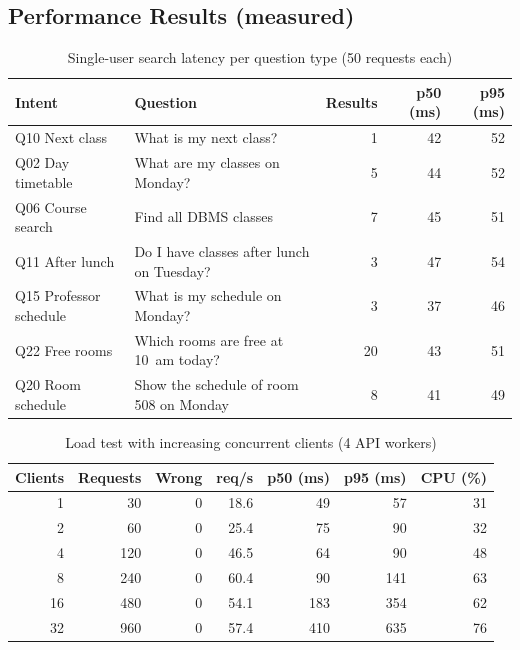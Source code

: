 \subsection{Performance Results (measured)}
\begin{table}[H]
\centering
\caption{Single-user search latency per question type (50 requests each)}
\label{tab:latency}
\small
\setlength{\tabcolsep}{4pt}\begin{tabular}{@{}llrrr@{}}
\toprule
\textbf{Intent} & \textbf{Question} & \textbf{Results} & \textbf{p50 (ms)} & \textbf{p95 (ms)}\\
\midrule
Q10 Next class & What is my next class? & 1 & 42 & 52\\
Q02 Day timetable & What are my classes on Monday? & 5 & 44 & 52\\
Q06 Course search & Find all DBMS classes & 7 & 45 & 51\\
Q11 After lunch & Do I have classes after lunch on Tuesday? & 3 & 47 & 54\\
Q15 Professor schedule & What is my schedule on Monday? & 3 & 37 & 46\\
Q22 Free rooms & Which rooms are free at 10~am today? & 20 & 43 & 51\\
Q20 Room schedule & Show the schedule of room 508 on Monday & 8 & 41 & 49\\
\bottomrule
\end{tabular}
\end{table}

\begin{table}[H]
\centering
\caption{Load test with increasing concurrent clients (4 API workers)}
\label{tab:loadresults}
\small
\begin{tabular}{@{}rrrrrrr@{}}
\toprule
\textbf{Clients} & \textbf{Requests} & \textbf{Wrong} & \textbf{req/s} & \textbf{p50 (ms)} & \textbf{p95 (ms)} & \textbf{CPU (\%)}\\
\midrule
1 & 30 & 0 & 18.6 & 49 & 57 & 31\\
2 & 60 & 0 & 25.4 & 75 & 90 & 32\\
4 & 120 & 0 & 46.5 & 64 & 90 & 48\\
8 & 240 & 0 & 60.4 & 90 & 141 & 63\\
16 & 480 & 0 & 54.1 & 183 & 354 & 62\\
32 & 960 & 0 & 57.4 & 410 & 635 & 76\\
\bottomrule
\end{tabular}
\end{table}


